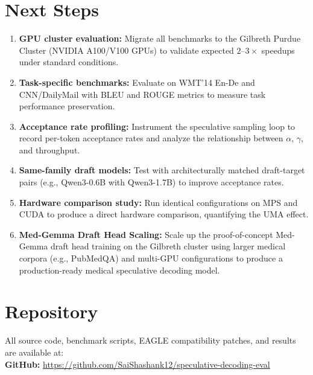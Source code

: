 \documentclass[11pt]{article}
\begin{document}
\section{Next Steps}

\begin{enumerate}
    \item \textbf{GPU cluster evaluation:} Migrate all benchmarks to the Gilbreth Purdue Cluster (NVIDIA A100/V100 GPUs) to validate expected $2$--$3\times$ speedups under standard conditions.
    \item \textbf{Task-specific benchmarks:} Evaluate on WMT'14 En-De and CNN/DailyMail with BLEU and ROUGE metrics to measure task performance preservation.
    \item \textbf{Acceptance rate profiling:} Instrument the speculative sampling loop to record per-token acceptance rates and analyze the relationship between $\alpha$, $\gamma$, and throughput.
    \item \textbf{Same-family draft models:} Test with architecturally matched draft-target pairs (e.g., Qwen3-0.6B with Qwen3-1.7B) to improve acceptance rates.
    \item \textbf{Hardware comparison study:} Run identical configurations on MPS and CUDA to produce a direct hardware comparison, quantifying the UMA effect.
    \item \textbf{Med-Gemma Draft Head Scaling:} Scale up the proof-of-concept Med-Gemma draft head training on the Gilbreth cluster using larger medical corpora (e.g., PubMedQA) and multi-GPU configurations to produce a production-ready medical speculative decoding model.
\end{enumerate}

\section{Repository}

All source code, benchmark scripts, EAGLE compatibility patches, and results are available at: \\
\textbf{GitHub:} \url{https://github.com/SaiShashank12/speculative-decoding-eval}



\end{document}
